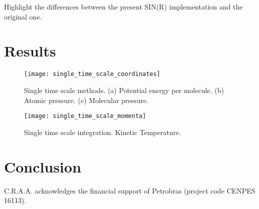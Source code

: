 \documentclass[
    journal=jctcce,
    layout=twocolumn
]{achemso}
\begin{document}
Highlight the differences between the present SIN(R) implementation and the original one.

\section{Results}


\begin{figure}
\texttt{[image: single\_time\_scale\_coordinates]}
\caption{Single time scale methods.
	(a) Potential energy per molecule.
	(b) Atomic pressure.
	(c) Molecular pressure.}
\label{fig:STS coordinate properties}
\end{figure}

\begin{figure}
	\texttt{[image: single\_time\_scale\_momenta]}
	\caption{Single time scale integration.
		Kinetic Temperature.}
	\label{fig:STS momentum properties}
\end{figure}

\section{Conclusion}


\begin{acknowledgement}

C.R.A.A. acknowledges the financial support of Petrobras (project code CENPES 16113).

\end{acknowledgement}


\end{document}
